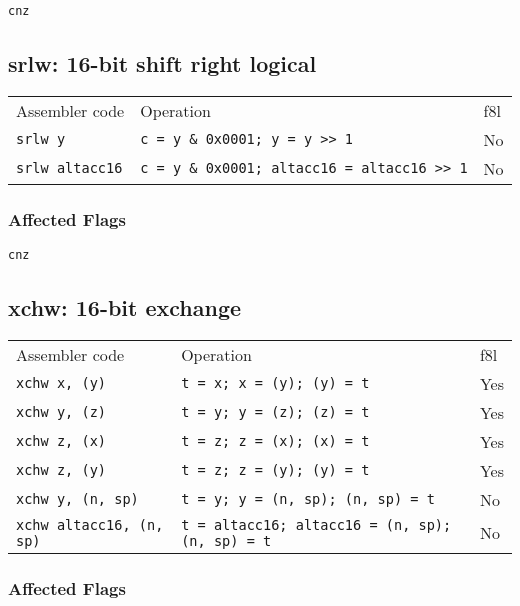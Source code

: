 \documentclass{book}
\begin{document}
\texttt{cnz}

\subsection{srlw: 16-bit shift right logical}

\begin{tabular}{l l l}
Assembler code         & Operation                                          & f8l \\
\texttt{srlw y}        & \texttt{c = y \& 0x0001; y = y >> 1}               & No \\
\texttt{srlw altacc16} & \texttt{c = y \& 0x0001; altacc16 = altacc16 >> 1} & No \\
\end{tabular}

\subsubsection*{Affected Flags}

\texttt{cnz}


\subsection{xchw: 16-bit exchange}

\begin{tabular}{l l l}
Assembler code                  & Operation                                              & f8l \\
\texttt{xchw x, (y)}            & \texttt{t = x; x = (y); (y) = t}                       & Yes \\
\texttt{xchw y, (z)}            & \texttt{t = y; y = (z); (z) = t}                       & Yes \\
\texttt{xchw z, (x)}            & \texttt{t = z; z = (x); (x) = t}                       & Yes \\
\texttt{xchw z, (y)}            & \texttt{t = z; z = (y); (y) = t}                       & Yes \\
\texttt{xchw y, (n, sp)}        & \texttt{t = y; y = (n, sp); (n, sp) = t}               & No \\
\texttt{xchw altacc16, (n, sp)} & \texttt{t = altacc16; altacc16 = (n, sp); (n, sp) = t} & No \\
\end{tabular}

\subsubsection*{Affected Flags}
\end{document}
